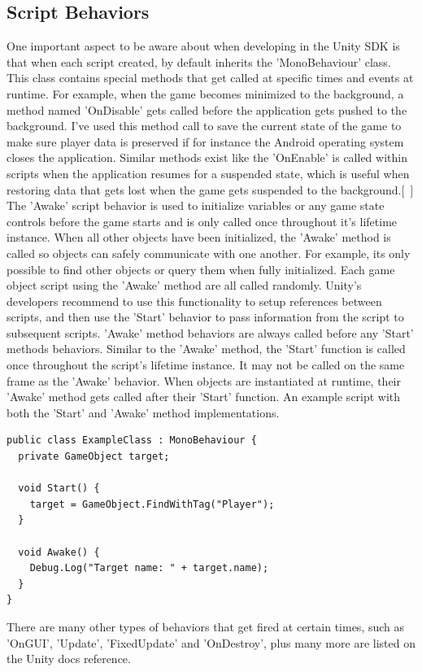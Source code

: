 \subsection{Script Behaviors}
One important aspect to be aware about when developing in the Unity SDK is that when each script created, by default inherits the 'MonoBehaviour' class. This class contains special methods that get called at specific times and events at runtime. For example, when the game becomes minimized to the background, a method named 'OnDisable' gets called before the application gets pushed to the background. I've used this method call to save the current state of the game to make sure player data is preserved if for instance the Android operating system closes the application. Similar methods exist like the 'OnEnable' is called within scripts when the application resumes for a suspended state, which is useful when restoring data that gets lost when the game gets suspended to the background.[~\cite{Script-Behaviours}]
The 'Awake' script behavior is used to initialize variables or any game state controls before the game starts and is only called once throughout it's lifetime instance. When all other objects have been initialized, the 'Awake' method is called so objects can safely communicate with one another. For example, its only possible to find other objects or query them when fully initialized. Each game object script using the 'Awake' method are all called randomly. Unity's developers recommend to use this functionality to setup references between scripts, and then use the 'Start' behavior to pass information from the script to subsequent scripts. 'Awake' method behaviors are always called before any 'Start' methods behaviors. Similar to the 'Awake' method, the 'Start' function is called once throughout the script's lifetime instance. It may not be called on the same frame as the 'Awake' behavior. When objects are instantiated at runtime, their 'Awake' method gets called after their 'Start' function. An example script with both the 'Start' and 'Awake' method implementations.
\begin{verbatim}
public class ExampleClass : MonoBehaviour {
  private GameObject target;
  
  void Start() {
    target = GameObject.FindWithTag("Player");
  }
  
  void Awake() {
    Debug.Log("Target name: " + target.name);
  }
}
\end{verbatim}
There are many other types of behaviors that get fired at certain times, such as 'OnGUI', 'Update', 'FixedUpdate' and 'OnDestroy', plus many more are listed on the Unity docs reference.
